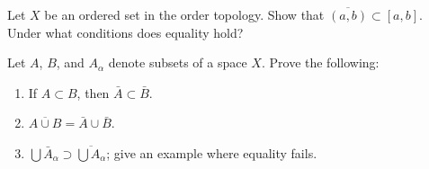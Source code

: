   \begin{exercise}[Munkres 17.5]
    Let $X$ be an ordered set in the order topology. Show that $\overline{(a, b)} \subset [a, b]$. Under what conditions does equality hold?
  \end{exercise}
  \begin{solution}
    
  \end{solution}

  \begin{exercise}[Munkres 17.6]
    Let $A$, $B$, and $A_\alpha$ denote subsets of a space $X$. Prove the following:
    \begin{enumerate}
      \item If $A \subset B$, then $\bar{A} \subset \bar{B}$.
      \item $\overline{A \cup B} = \bar{A} \cup \bar{B}$.
      \item $\bigcup \bar{A}_\alpha \supset \overline{\bigcup A_\alpha}$; give an example where equality fails.
    \end{enumerate}
  \end{exercise}
